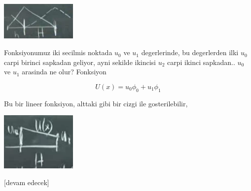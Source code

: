 \documentclass[12pt,fleqn]{article}\usepackage{../../common}
\begin{document}
\includegraphics[width=10em]{compscieng_1_20_02.png}

Fonksiyonumuz iki secilmis noktada $u_0$ ve $u_1$ degerlerinde, bu degerlerden
ilki $u_0$ carpi birinci sapkadan geliyor, ayni sekilde ikincisi $u_2$ carpi
ikinci sapkadan.. $u_0$ ve $u_1$ arasinda ne olur? Fonksiyon

$$
U(x) = u_0 \phi_0 + u_1 \phi_1
$$

Bu bir lineer fonksiyon, alttaki gibi bir cizgi ile gosterilebilir,

\includegraphics[width=10em]{compscieng_1_20_03.png}

















[devam edecek]
\end{document}
